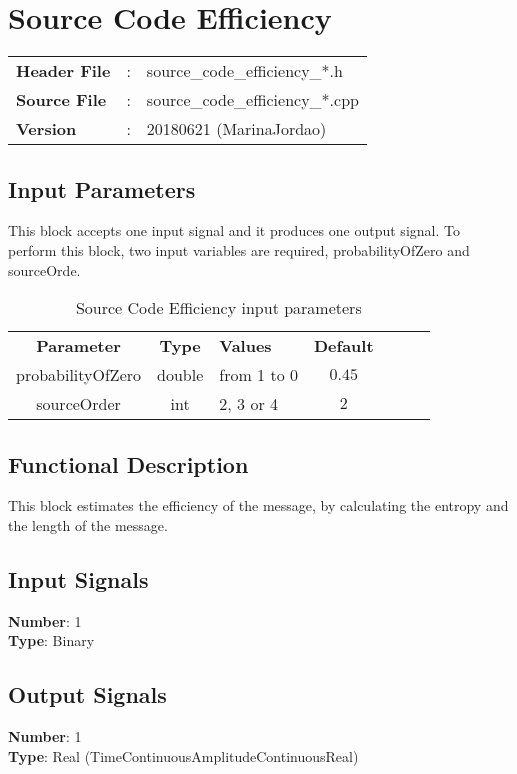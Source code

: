 \clearpage

\section{Source Code Efficiency}

\begin{tcolorbox}	
\begin{tabular}{p{2.75cm} p{0.2cm} p{10.5cm}} 	
\textbf{Header File}   &:& source\_code\_efficiency\_*.h \\
\textbf{Source File}   &:&  source\_code\_efficiency\_*.cpp \\
\textbf{Version}       &:& 20180621 (MarinaJordao)
\end{tabular}
\end{tcolorbox}


\subsection*{Input Parameters}

This block accepts one input signal and it produces one output signal. To perform this block, two input variables are required, probabilityOfZero and sourceOrde.


\begin{table}[h]
	\centering
	\begin{tabular}{|c|c|p{60mm}|c|ccp{60mm}}
		\cline{1-4}
		\textbf{Parameter} & \textbf{Type} & \textbf{Values} &   \textbf{Default}& \\ \cline{1-4}
		probabilityOfZero & double & from 1 to 0 & $0.45$ \\ \cline{1-4}
		sourceOrder & int & 2, 3 or 4 & $2$ \\ \cline{1-4}
	\end{tabular}
	\caption{Source Code Efficiency input parameters}
	\label{table:sink_in_par}
\end{table}


\subsection*{Functional Description}

This block estimates the efficiency of the message, by calculating the entropy and the length of the message.

\subsection*{Input Signals}

\textbf{Number}: 1\\
\textbf{Type}: Binary

\subsection*{Output Signals}

\textbf{Number}: 1\\
\textbf{Type}: Real   (TimeContinuousAmplitudeContinuousReal)

%
